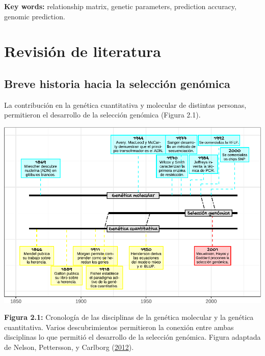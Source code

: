 \documentclass[11pt,spanish,a4paper,oneside,]{book} %
\begin{document}
\hspace*{1em}

\noindent 
\textbf{Key words:} relationship matrix, genetic parameters, prediction accuracy, genomic prediction.

\clearpage\null\thispagestyle{empty}

\hypertarget{revisiuxf3n-de-literatura}{%
\chapter{Revisión de literatura}\label{revisiuxf3n-de-literatura}}

\hypertarget{breve-historia-hacia-la-selecciuxf3n-genuxf3mica}{%
\section{Breve historia hacia la selección genómica}\label{breve-historia-hacia-la-selecciuxf3n-genuxf3mica}}

La contribución en la genética cuantitativa y molecular de distintas personas, permitieron el desarrollo de la selección genómica (Figura 2.1).

\begin{center}\includegraphics[width=1\linewidth]{figures/Crono_2} \end{center}

\textbf{Figura 2.1:} Cronología de las disciplinas de la genética molecular y la genética cuantitativa. Varios descubrimientos permitieron la conexión entre ambas disciplinas lo que permitió el desarrollo de la selección genómica. Figura adaptada de Nelson, Pettersson, y Carlborg (\protect\hyperlink{ref-cite:2}{2012}).
\end{document}
